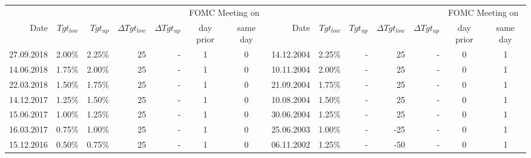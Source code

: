 \documentclass[11pt,a4paper,english,oneside]{book}
\numberwithin{equation}{chapter}
\begin{document}
\begin{table} %
	\centering %
	\begin{tabular}{r r r r r c c | r r r r r c c } %
		\toprule %
		& & & & & \multicolumn{2}{l}{FOMC Meeting on} & & & & & & \multicolumn{2}{l}{FOMC Meeting on} \\ %
		Date & $Tgt_{low}$ & $Tgt_{up}$ & $\Delta Tgt_{low}$ & $\Delta Tgt_{up}$ & day prior &  same day & Date & $Tgt_{low}$ & $Tgt_{up}$ & $\Delta Tgt_{low}$ & $\Delta Tgt_{up}$ & day prior &  same day \\ %
		\midrule %
		27.09.2018 & 2.00\% & 2.25\% & 25  &  -   & 1 & 0 & 14.12.2004 & 2.25\% &  - & 25  &  - & 0 & 1 \\
		14.06.2018 & 1.75\% & 2.00\% & 25  &  -   & 1 & 0 & 10.11.2004 & 2.00\% &  - & 25  &  - & 0 & 1 \\
		22.03.2018 & 1.50\% & 1.75\% & 25  &  -   & 1 & 0 & 21.09.2004 & 1.75\% &  - & 25  &  - & 0 & 1 \\
		14.12.2017 & 1.25\% & 1.50\% & 25  &  -   & 1 & 0 & 10.08.2004 & 1.50\% &  - & 25  &  - & 0 & 1 \\
		15.06.2017 & 1.00\% & 1.25\% & 25  &  -   & 1 & 0 & 30.06.2004 & 1.25\% &  - & 25  &  - & 0 & 1 \\
		16.03.2017 & 0.75\% & 1.00\% & 25  &  -   & 1 & 0 & \cellcolor{lightgray!25}25.06.2003 & \cellcolor{lightgray!25}1.00\% &  \cellcolor{lightgray!25}- & \cellcolor{lightgray!25}-25 &  \cellcolor{lightgray!25}- & 0 & 1 \\
		15.12.2016 & 0.50\% & 0.75\% & 25  &  -   & 1 & 0 & \cellcolor{lightgray!25}06.11.2002 & \cellcolor{lightgray!25}1.25\% &  \cellcolor{lightgray!25}- & \cellcolor{lightgray!25}-50 &  \cellcolor{lightgray!25}- & 0 & 1 \\

\end{tabular}
\end{table}
\end{document}
